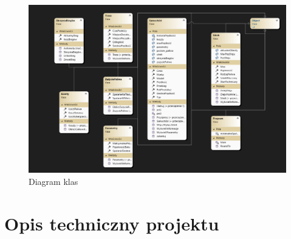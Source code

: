 \begin{figure}[!ht]
	\centering
		\includegraphics[width=16cm]{Diagram klas.png}
	\caption{\footnotesize Diagram klas}
	\label{fig:plotend}
\end{figure}
\newpage
\section{Opis techniczny projektu}

